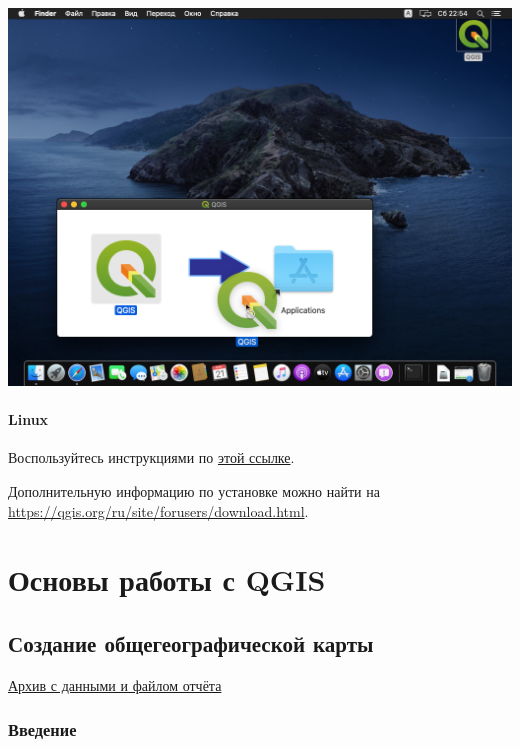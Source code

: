 \documentclass[
  12pt,
]{book}
\begin{document}
\includegraphics{images/installation_instruction_mac/mac05.png}

\hypertarget{linux}{%
\subsection*{Linux}\label{linux}}

Воспользуйтесь инструкциями по \href{https://qgis.org/ru/site/forusers/alldownloads.html\#linux}{этой ссылке}.

Дополнительную информацию по установке можно найти на \url{https://qgis.org/ru/site/forusers/download.html}.

\hypertarget{part-ux43eux441ux43dux43eux432ux44b-ux440ux430ux431ux43eux442ux44b-ux441-qgis}{%
\part{Основы работы с QGIS}\label{part-ux43eux441ux43dux43eux432ux44b-ux440ux430ux431ux43eux442ux44b-ux441-qgis}}

\hypertarget{map-design-general}{%
\chapter{Создание общегеографической карты}\label{map-design-general}}

\href{https://1drv.ms/u/s!AmtmZDq3JgxHgZUGIl2IXikh_JmrhA?e=NdRmIe}{Архив с данными и файлом отчёта}

\hypertarget{map-design-general-intro}{%
\section{Введение}\label{map-design-general-intro}}
\end{document}
